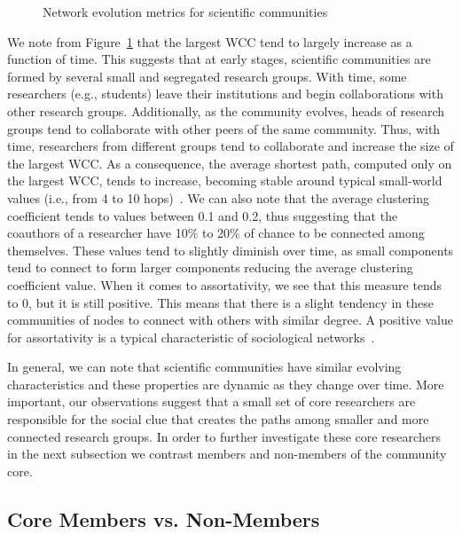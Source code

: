 \begin{figure}[!ht]
\begin{center}
{  }%
  \end{center}
  \vspace{-0.5cm}
  \caption{Network evolution metrics for scientific communities}
  \vspace{-0.5cm}
  \label{fig:metrics}
\end{figure}


We note from Figure~\ref{fig:metrics} that the largest WCC tend to largely increase as a function of time. This suggests that at early
stages, scientific communities are formed by several small and segregated research groups. With time, some researchers (e.g., students) leave their institutions and begin collaborations
with other research groups. Additionally, as the community evolves, heads of  research groups tend to collaborate with other peers of the same community. Thus, with time, researchers
from different groups tend to collaborate and increase the size of the largest WCC. As a consequence, the average shortest path, computed only on the largest
WCC, tends to increase, becoming stable around typical small-world values (i.e., from 4 to 10 hops)~\cite{mislove-2007-socialnetworks,fourdegrees_facebook}.  We can
also note that the average clustering coefficient tends to values between 0.1 and 0.2, thus suggesting that the coauthors of a researcher have 10\% to 20\% of chance to be connected
among themselves. These values tend to slightly diminish over time, as small components tend to connect to form larger components reducing the average clustering coefficient
value.  When it comes to assortativity, we see that this measure tends to 0, but it is still positive. This means that there is a slight tendency in these communities of nodes to
connect with others with similar degree.  A positive value for assortativity is a typical characteristic of sociological networks~\cite{Newman2003}.

In general, we can note that scientific communities have similar evolving characteristics and these properties are dynamic as they change over time.  More important, our
observations suggest that a small set of core researchers are responsible for the social clue that creates the paths among smaller and more connected research groups. In order to 
further investigate these core researchers in the next subsection we contrast members and non-members of the community core. 







\subsection{Core Members vs. Non-Members}
\label{sub:vs}

